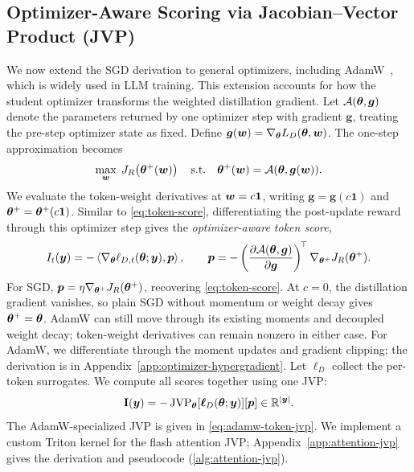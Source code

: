 \documentclass{article} %
\begin{document}
\subsection{Optimizer-Aware Scoring via Jacobian--Vector Product (JVP)}
\label{sec:general_rad}
We now extend the SGD derivation to general optimizers, including AdamW~\citep{loshchilov2018decoupled}, 
which is widely used in LLM training. This extension accounts for how the student optimizer transforms 
the weighted distillation gradient. 
Let \(\mathcal A(\bm{\theta},\boldsymbol g)\) denote the parameters returned
by one optimizer step with gradient \(\boldsymbol g\), treating the
pre-step optimizer state as fixed. Define
\(\boldsymbol g(\bm{w})=\nabla_{\bm{\theta}}L_D(\bm{\theta},\bm{w})\).
The one-step approximation becomes
\begin{equation*}
    \max_{\bm{w}}\;J_R\!\left(\bm{\theta}^+(\bm{w})\right)
    \quad\text{s.t.}\quad
    \bm{\theta}^+(\bm{w})=\mathcal A(\bm{\theta},\boldsymbol g(\bm{w})).
\end{equation*}
We evaluate the token-weight derivatives at \(\bm{w}=c\mathbf1\),
writing \(\boldsymbol g=\boldsymbol g(c\mathbf1)\) and
\(\bm{\theta}^+=\bm{\theta}^+(c\mathbf1)\).
Similar to \cref{eq:token-score}, differentiating the post-update
reward through this optimizer step gives the
\textit{optimizer-aware token score},
\begin{equation}
    I_t(\bm{y})
    =-\left\langle
        \nabla_{\bm{\theta}}\ell_{D,t}(\bm{\theta};\bm{y}),
        \boldsymbol p
    \right\rangle,
    \qquad
    \boldsymbol p
    =-\left(
        \frac{\partial\mathcal A(\bm{\theta},\boldsymbol g)}
             {\partial\boldsymbol g}
    \right)^{\!\top}
    \nabla_{\bm{\theta}^+}J_R(\bm{\theta}^+).
    \label{eq:optimizer-reward-direction}
\end{equation}
For SGD, \(\boldsymbol p=\eta\nabla_{\bm{\theta}^+}J_R(\bm{\theta}^+)\), recovering
\cref{eq:token-score}. At \(c=0\), the distillation gradient vanishes, so
plain SGD without momentum or weight decay gives \(\bm{\theta}^+=\bm{\theta}\).
AdamW can still move through its existing moments and decoupled weight decay;
token-weight derivatives can remain nonzero in either case.
For AdamW, we differentiate through the moment updates
and gradient clipping; the derivation is in Appendix~\ref{app:optimizer-hypergradient}.
Let \(\boldsymbol\ell_D\) collect the per-token surrogates. We compute all
scores together using one JVP:
\begin{equation}
    \mathbf{I}(\bm{y})
    =-\operatorname{JVP}_{\bm{\theta}}
    [\boldsymbol\ell_D(\bm{\theta};\bm{y})]
    [\boldsymbol p] \in \mathbb{R}^{\left\lvert\bm{y}\right\rvert}.
    \label{eq:token-score-jvp}
\end{equation}
The AdamW-specialized JVP is given in \cref{eq:adamw-token-jvp}. We implement
a custom Triton kernel for the flash attention JVP; Appendix~\ref{app:attention-jvp}
gives the derivation and pseudocode (\cref{alg:attention-jvp}).
\end{document}
